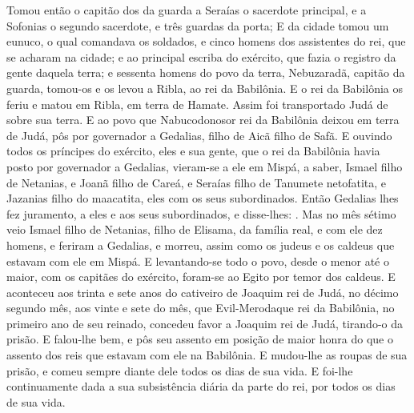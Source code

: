 {  Tomou então o capitão dos da guarda a Seraías o sacerdote principal, e a Sofonias o segundo sacerdote, e três guardas da porta;
  E da cidade tomou um eunuco, o qual comandava os soldados, e cinco homens dos assistentes do rei, que se acharam na cidade; e ao principal escriba do exército, que fazia o registro da gente daquela terra; e sessenta homens do povo da terra,
  Nebuzaradã, capitão da guarda, tomou-os e os levou a Ribla, ao rei da Babilônia.
  E o rei da Babilônia os feriu e matou em Ribla, em terra de Hamate. Assim foi transportado Judá de sobre sua terra.
  E ao povo que Nabucodonosor rei da Babilônia deixou em terra de Judá, pôs por governador a Gedalias, filho de Aicã filho de Safã.
  E ouvindo todos os príncipes do exército, eles e sua gente, que o rei da Babilônia havia posto por governador a Gedalias, vieram-se a ele em Mispá, a saber, Ismael filho de Netanias, e Joanã filho de Careá, e Seraías filho de Tanumete netofatita, e Jazanias filho do maacatita, eles com os seus subordinados.
  Então Gedalias lhes fez juramento, a eles e aos seus subordinados, e disse-lhes: .
  Mas no mês sétimo veio Ismael filho de Netanias, filho de Elisama, da família real, e com ele dez homens, e feriram a Gedalias, e morreu, assim como os judeus e os caldeus que estavam com ele em Mispá.
  E levantando-se todo o povo, desde o menor até o maior, com os capitães do exército, foram-se ao Egito por temor dos caldeus.
  E aconteceu aos trinta e sete anos do cativeiro de Joaquim rei de Judá, no décimo segundo mês, aos vinte e sete do mês, que Evil-Merodaque rei da Babilônia, no primeiro ano de seu reinado, concedeu favor a Joaquim rei de Judá, tirando-o da prisão.
  E falou-lhe bem, e pôs seu assento em posição de maior honra do que o assento dos reis que estavam com ele na Babilônia.
  E mudou-lhe as roupas de sua prisão, e comeu sempre diante dele todos os dias de sua vida.
  E foi-lhe continuamente dada a sua subsistência diária da parte do rei, por todos os dias de sua vida.
 \par }

